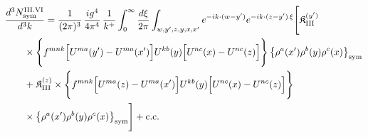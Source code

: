 \begin{align}\label{eq:H-III.VI-3}
&\frac{d^{3}N^{\rm III.VI}_{{\rm sym}}}{d^{3}k}=\frac{1}{(2\pi)^{3}}\, \frac{ig^{4}}{4\pi^{4}}\, \frac{1}{k^{+}} \int_{0}^{\infty}\frac{d\xi}{2\pi} \int_{w,y',z,y,x,x'}e^{-ik\cdot(w-y')}e^{-ik\cdot(z-y')\,\xi}\Bigg[ \mathfrak{K}^{(y')}_{\rm III}\notag\\
&\quad\quad \times \Bigg\{f^{mnk}\Big[U^{ma}(y')-U^{ma}(x')\Big]U^{kb}(y)\Big[U^{nc}(x)-U^{nc}(z)\Big]\Bigg\}\, \big\{\rho^{a}(x')\rho^{b}(y)\rho^{c}(x)\big\}_{\rm sym}\notag\\
&\quad\quad + \mathfrak{K}^{(z)}_{\rm III} \times \Bigg\{f^{mnk}\Big[U^{ma}(z)-U^{ma}(x')\Big]U^{kb}(y)\Big[U^{nc}(x)-U^{nc}(z)\Big]\Bigg\}\notag\\
&\quad\quad \times \big\{\rho^{a}(x')\rho^{b}(y)\rho^{c}(x)\big\}_{\rm sym}\Bigg] +{\rm c.c.}
\end{align}
